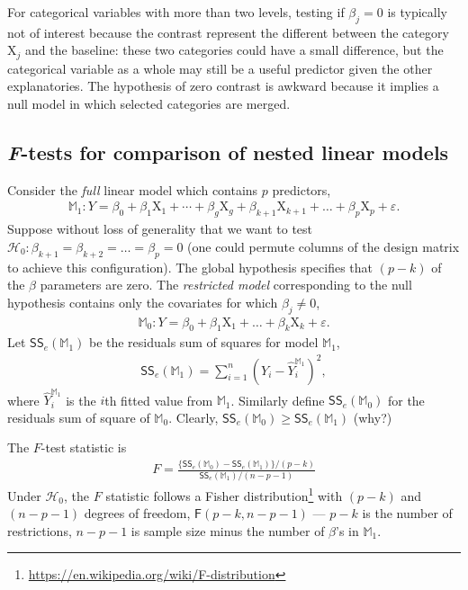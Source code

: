 \documentclass[
  11pt,
  letterpaper,
]{book}
\renewcommand{\href}[2]{#2\footnote{\url{#1}}}
\theoremstyle{definition}
\theoremstyle{definition}
\theoremstyle{definition}
\theoremstyle{remark}
\begin{document}
For categorical variables with more than two levels, testing if \(\beta_j=0\) is typically not of interest because the contrast represent the different between the category \(\mathrm{X}_j\) and the baseline: these two categories could have a small difference, but the categorical variable as a whole may still be a useful predictor given the other explanatories. The hypothesis of zero contrast is awkward because it implies a null model in which selected categories are merged.

\hypertarget{ftestslm}{%
\subsection{\texorpdfstring{\emph{F}-tests for comparison of nested linear models}{F-tests for comparison of nested linear models}}\label{ftestslm}}

Consider the \emph{full} linear model which contains \(p\) predictors,
\begin{align*}
\mathbb{M}_1: Y=\beta_0+\beta_1 \mathrm{X}_1 + \cdots + \beta_g \mathrm{X}_g + \beta_{k+1}\mathrm{X}_{k+1} + \ldots + \beta_p \mathrm{X}_p + \varepsilon.
\end{align*}
Suppose without loss of generality that we want to test \(\mathscr{H}_0: \beta_{k+1}=\beta_{k+2}=\ldots=\beta_p=0\) (one could permute columns of the design matrix to achieve this configuration).
The global hypothesis specifies that \((p-k)\) of the \(\beta\) parameters are zero. The \emph{restricted model} corresponding to the null hypothesis contains only the covariates for which \(\beta_j \neq 0\),
\begin{align*}
\mathbb{M}_0: Y=\beta_0+\beta_1 \mathrm{X}_1 + \ldots + \beta_k \mathrm{X}_k + \varepsilon.
\end{align*}
Let \(\mathsf{SS}_e(\mathbb{M}_1)\) be the residuals sum of squares for model \(\mathbb{M}_1\),
\begin{align*}
\mathsf{SS}_e(\mathbb{M}_1)=\sum_{i=1}^n (Y_i-\widehat{Y}_i^{\mathbb{M}_1})^2,
\end{align*}
where \(\widehat{Y}_i^{\mathbb{M}_1}\) is the \(i\)th fitted value from \(\mathbb{M}_1\). Similarly define \(\mathsf{SS}_e(\mathbb{M}_0)\) for the residuals sum of square of \(\mathbb{M}_0\). Clearly, \(\mathsf{SS}_e(\mathbb{M}_0) \geq \mathsf{SS}_e(\mathbb{M}_1)\) (why?)

The \(F\)-test statistic is
\begin{align*}
F=\frac{\{\mathsf{SS}_e(\mathbb{M}_0)-\mathsf{SS}_e(\mathbb{M}_1)\}/(p-k)}{\mathsf{SS}_e(\mathbb{M}_1)/(n-p-1)}
\end{align*}
Under \(\mathscr{H}_0\), the \(F\) statistic follows a \href{https://en.wikipedia.org/wiki/F-distribution}{Fisher distribution} with \((p-k)\) and \((n-p-1)\) degrees of freedom, \(\mathsf{F}(p-k, n-p-1)\) --- \(p-k\) is the number of restrictions, \(n-p-1\) is sample size minus the number of \(\beta\)'s in \(\mathbb{M}_1\).
\end{document}

